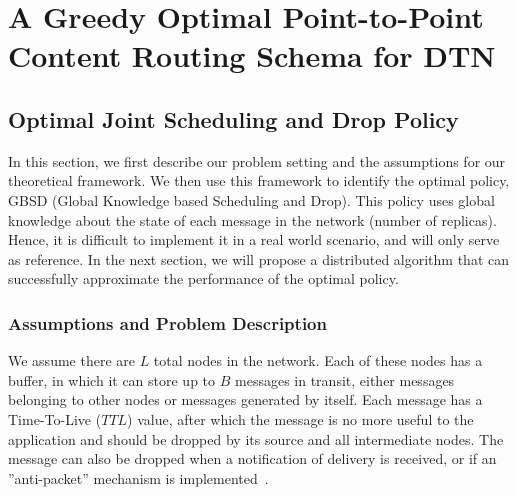 \chapter{A Greedy Optimal Point-to-Point Content Routing Schema for DTN}
\label{chapter:ptp}
\minitoc

\section{Optimal Joint Scheduling and Drop Policy}
\label{sec:optimal-policy}

In this section, we first describe our problem setting and the assumptions for our theoretical framework. We then use this framework to identify the optimal policy, GBSD (Global Knowledge based Scheduling and Drop). This policy uses global knowledge about the state of each message in the network (number of replicas). Hence, it is difficult to implement it in a real world scenario, and will only serve as reference. In the next section, we will propose a distributed algorithm that can successfully approximate the performance of the optimal policy.

\subsection{Assumptions and Problem Description}
\label{subsec:ProblemDescription}

We assume there are $L$ total nodes in the network. Each of these nodes has a buffer, in which it can store up to $B$ messages in transit, either messages belonging to other nodes or messages generated by itself. Each message has a Time-To-Live ($TTL$) value, after which the message is no more useful to the application and should be dropped by its source and all intermediate nodes. The message can also be dropped when a notification of delivery is received, or if an ''anti-packet'' mechanism is implemented~\cite{Towsley:Epidemic}.

